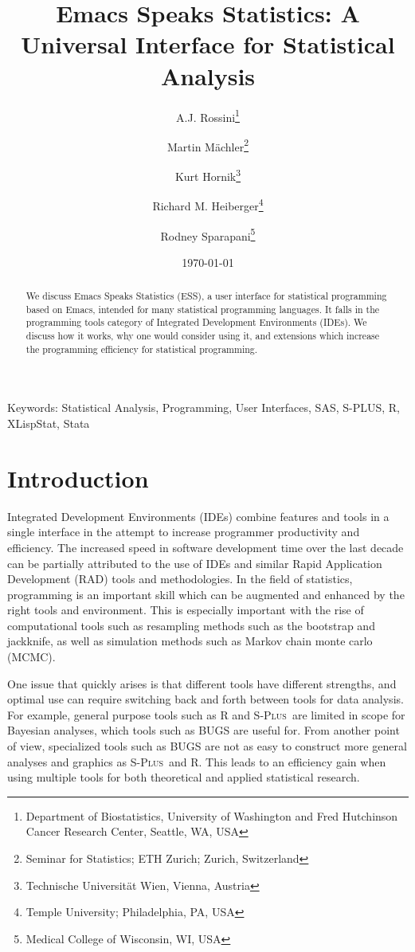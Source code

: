 \documentclass{article}
\title{Emacs Speaks Statistics: A Universal Interface for
  Statistical Analysis}
\author{A.J. Rossini\footnote{Department of Biostatistics, University
    of Washington and Fred Hutchinson Cancer Research Center, Seattle,
    WA, USA} \and Martin M{\"a}chler\footnote{Seminar for Statistics;
    ETH Zurich; Zurich, Switzerland} \and Kurt
  Hornik\footnote{Technische Universit{\"a}t Wien, Vienna, Austria}
  \and Richard M. Heiberger\footnote{Temple University; Philadelphia,
    PA, USA} \and Rodney Sparapani\footnote{Medical College of
    Wisconsin, WI, USA}}
\date{\today}
\newif\ifpdf
\newcommand*{\Splus}{\textsc{S-Plus}}
\begin{document}
\ifpdf
  \DeclareGraphicsExtensions{.jpg,.pdf,.png,.mps}
\fi


\maketitle

Keywords: Statistical Analysis, Programming, User Interfaces, SAS,
S-PLUS, R, XLispStat, Stata

\begin{abstract}
  We discuss Emacs Speaks Statistics (ESS), a user interface for
  statistical programming based on Emacs, intended for many
  statistical programming languages.  It falls in the programming
  tools category of Integrated Development Environments (IDEs).  We
  discuss how it works, why one would consider using it, and
  extensions which increase the programming efficiency for statistical
  programming.
\end{abstract}

\section{Introduction}
\label{sec:intro}

Integrated Development Environments (IDEs) combine features and tools
in a single interface in the attempt to increase programmer
productivity and efficiency.  The increased speed in software
development time over the last decade can be partially attributed to
the use of IDEs and similar Rapid Application Development (RAD) tools
and methodologies.  In the field of statistics, programming is an
important skill which can be augmented and enhanced by the right tools
and environment.  This is especially important with the rise of
computational tools such as resampling methods such as the bootstrap
and jackknife, as well as simulation methods such as Markov chain
monte carlo (MCMC).  

One issue that quickly arises is that different tools have different
strengths, and optimal use can require switching back and forth
between tools for data analysis.  For example, general purpose tools
such as R \citep{ihak:gent:1996} and \Splus\ are limited in scope for
Bayesian analyses, which tools such as BUGS are useful for.  From
another point of view, specialized tools such as BUGS are not as easy
to construct more general analyses and graphics as \Splus\ and R.  This
leads to an efficiency gain when using multiple tools for both
theoretical and applied statistical research.
\end{document}
